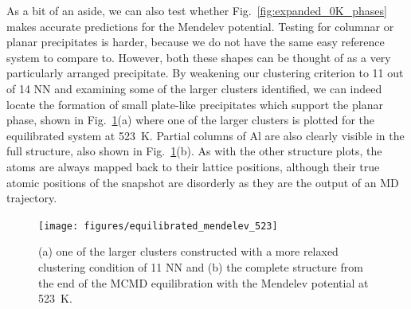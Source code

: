 As a bit of an aside, we can also test whether Fig.~\ref{fig:expanded_0K_phases} makes accurate predictions for the Mendelev potential.
Testing for columnar or planar precipitates is harder, because we do not have the same easy reference system to compare to.
However, both these shapes can be thought of as a very particularly arranged \BTWO precipitate.
By weakening our clustering criterion to 11 out of 14 NN and examining some of the larger \BTWO clusters identified, we can indeed locate the formation of small plate-like precipitates which support the planar phase, shown in Fig.~\ref{fig:mendelev_structure}(a) where one of the larger clusters is plotted for the equilibrated system at 523~K.
Partial columns of Al are also clearly visible in the full structure, also shown in Fig.~\ref{fig:mendelev_structure}(b).
As with the other structure plots, the atoms are always mapped back to their lattice positions, although their true atomic positions of the snapshot are disorderly as they are the output of an MD trajectory.
%
\begin{figure}[h]
    \centering
    \texttt{[image: figures/equilibrated\_mendelev\_523]}
    \caption{(a) one of the larger \BTWO clusters constructed with a more relaxed clustering condition of 11 NN and (b) the complete structure from the end of the MCMD equilibration with the Mendelev potential at 523~K.}
    \label{fig:mendelev_structure}
\end{figure}
